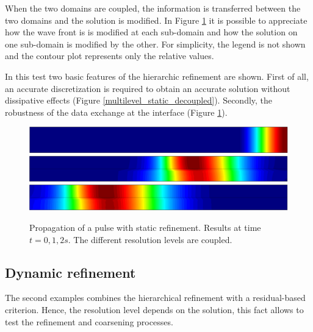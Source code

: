 When the two domains are coupled, the information is transferred between the two domains and the solution is modified. In Figure \ref{multilevel_static_coupled} it is possible to appreciate how the wave front is is modified at each sub-domain and how the solution on one sub-domain is modified by the other. For simplicity, the legend is not shown and the contour plot represents only the relative values.

In this test two basic features of the hierarchic refinement are shown. First of all, an accurate discretization is required to obtain an accurate solution without dissipative effects (Figure \ref{multilevel_static_decoupled}). Secondly, the robustness of the data exchange at the interface (Figure \ref{multilevel_static_coupled}).


\begin{figure} [htb]
    \centering
    \includegraphics[width=\textwidth]{img/multigrid/static/coupled-0}\\
    \vspace{5pt}
    \includegraphics[width=\textwidth]{img/multigrid/static/coupled-1}\\
    \vspace{5pt}
    \includegraphics[width=\textwidth]{img/multigrid/static/coupled-2}
    \caption{Propagation of a pulse with static refinement. Results at time $t=0,1,2s$. The different resolution levels are coupled.}
    \label{multilevel_static_coupled}
\end{figure}


\subsection{Dynamic refinement}


The second examples combines the hierarchical refinement with a residual-based criterion. Hence, the resolution level depends on the solution, this fact allows to test the refinement and coarsening processes.

